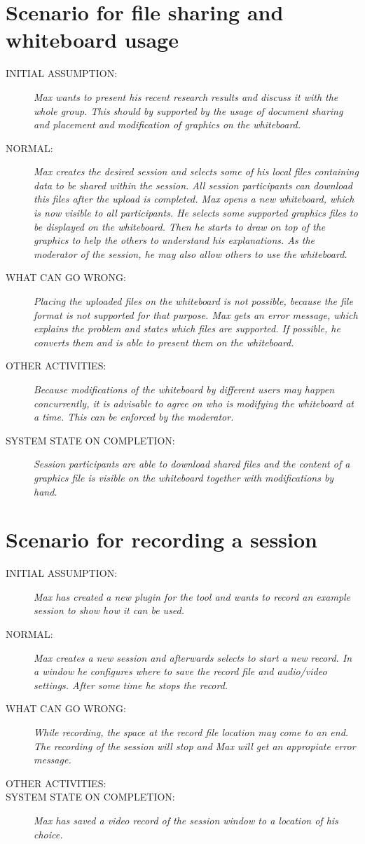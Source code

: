 \section{Scenario for file sharing and whiteboard usage}
\begin{description}
\item[INITIAL ASSUMPTION:]
\textit{Max wants to present his recent research results and discuss it with the
whole group. This should by supported by the usage of document sharing and placement 
and modification of graphics on the whiteboard.}
\item[NORMAL:]
\textit{Max creates the desired session and selects some of his local files
containing data to be shared within the session. All session participants can download this
files after the upload is completed. Max opens a new whiteboard, which is
now visible to all participants. He selects some supported graphics files to be 
displayed on the whiteboard. Then he starts to draw on top of the graphics to
help the others to understand his explanations. As the moderator of the
session, he may also allow others to use the whiteboard.}
\item[WHAT CAN GO WRONG:]
\textit{Placing the uploaded files on the whiteboard is not possible, because the
file format is not supported for that purpose. Max gets an error message, which
explains the problem and states which files are supported. If possible, he
converts them and is able to present them on the whiteboard.}
\item[OTHER ACTIVITIES:]
\textit{Because modifications of the whiteboard by different users may happen
concurrently, it is advisable to agree on who is modifying the whiteboard
at a time. This can be enforced by the moderator.}
\item[SYSTEM STATE ON COMPLETION:]
\textit{Session participants are able to download shared files and
the content of a graphics file is visible on the whiteboard together with
modifications by hand.}
\end{description}


\section{Scenario for recording a session}
\begin{description}
\item[INITIAL ASSUMPTION:]
\textit{Max has created a new plugin for the tool and wants to record an example
session to show how it can be used.}
\item[NORMAL:]
\textit{Max creates a new session and afterwards selects to start a new record.
In a window he configures where to save the record file and audio/video
settings. After some time he stops the record.}
\item[WHAT CAN GO WRONG:]
\textit{While recording, the space at the record file location may come to an
end. The recording of the session will stop and Max will get an appropiate error
message.}
\item[OTHER ACTIVITIES:]
\item[SYSTEM STATE ON COMPLETION:]
\textit{Max has saved a video record of the session window to a location of
his choice.}
\end{description}